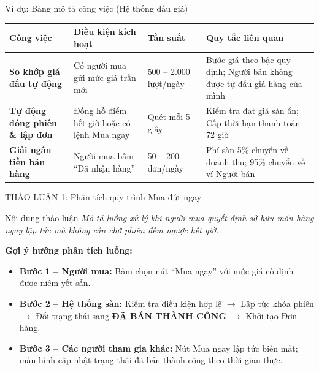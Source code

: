 \documentclass[aspectratio=169, 10pt]{beamer}
\begin{document}
\begin{frame}{Ví dụ: Bảng mô tả công việc (Hệ thống đấu giá)}
    \small
    \begin{table}[h]
        \centering
        \begin{tabular}{p{3.2cm} p{3cm} p{2cm} p{4.6cm}}
            \toprule
            \textbf{Công việc} & \textbf{Điều kiện kích hoạt} & \textbf{Tần suất} & \textbf{Quy tắc liên quan} \\
            \midrule
            \textbf{So khớp giá đấu tự động} & Có người mua gửi mức giá trần mới & 500 -- 2.000 lượt/ngày & Bước giá theo bậc quy định; Người bán không được tự đấu giá hàng của mình \\
            \midrule
            \textbf{Tự động đóng phiên \& lập đơn} & Đồng hồ điểm hết giờ hoặc có lệnh Mua ngay & Quét mỗi 5 giây & Kiểm tra đạt giá sàn ẩn; Cấp thời hạn thanh toán 72 giờ \\
            \midrule
            \textbf{Giải ngân tiền bán hàng} & Người mua bấm ``Đã nhận hàng'' & 50 -- 200 đơn/ngày & Phí sàn 5\% chuyển về doanh thu; 95\% chuyển về ví Người bán \\
            \bottomrule
        \end{tabular}
    \end{table}
\end{frame}

\begin{frame}{THẢO LUẬN 1: Phân tích quy trình Mua đứt ngay}
    \begin{block}{Nội dung thảo luận}
        \textit{Mô tả luồng xử lý khi người mua quyết định sở hữu món hàng ngay lập tức mà không cần chờ phiên đếm ngược hết giờ.}
    \end{block}
    \vspace{0.3cm}
    \textbf{Gợi ý hướng phân tích luồng:}
    \begin{itemize}
        \item \textbf{Bước 1 -- Người mua:} Bấm chọn nút ``Mua ngay'' với mức giá cố định được niêm yết sẵn.
        \item \textbf{Bước 2 -- Hệ thống sàn:} Kiểm tra điều kiện hợp lệ $\rightarrow$ Lập tức khóa phiên $\rightarrow$ Đổi trạng thái sang \textbf{ĐÃ BÁN THÀNH CÔNG} $\rightarrow$ Khởi tạo Đơn hàng.
        \item \textbf{Bước 3 -- Các người tham gia khác:} Nút Mua ngay lập tức biến mất; màn hình cập nhật trạng thái đã bán thành công theo thời gian thực.
    \end{itemize}
\end{frame}
\end{document}
